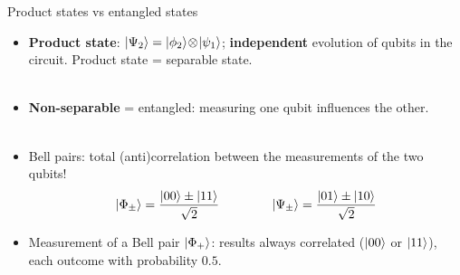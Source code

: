 \documentclass[aspectratio=169,12pt]{beamer}
\begin{document}

\begin{frame}{Product states vs entangled states}
  \begin{itemize}[<+->]
    \item \textbf{Product state}: $\ket{\Psi_2}=\ket{\phi_2}\!\otimes\!\ket{\psi_1}$; \textbf{independent} evolution of qubits in the circuit. Product state = separable state.
    \\~\\
    \item \textbf{Non-separable} = entangled: measuring one qubit influences the other.
    \\~\\
    \item Bell pairs: total (anti)correlation between the measurements of the two qubits!
    \begin{align*}
      \ket{\Phi_{\pm}}=\frac{\ket{00}\pm\ket{11}}{\sqrt{2}}
      \qquad\qquad
      \ket{\Psi_{\pm}}=\frac{\ket{01}\pm\ket{10}}{\sqrt{2}}
    \end{align*}
    \item Measurement of a Bell pair $\ket{\Phi_+}$: results always correlated ($\ket{00}$ or $\ket{11}$), each outcome with probability $0.5$.
  \end{itemize}
\end{frame}
\end{document}
